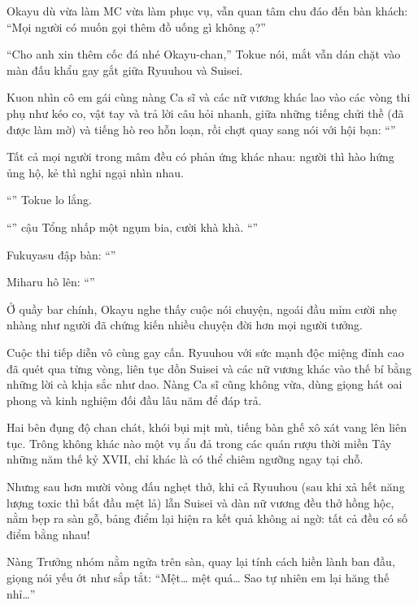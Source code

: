 \documentclass[../main.tex]{subfiles}
\begin{document}
Okayu dù vừa làm MC vừa làm phục vụ, vẫn quan tâm chu đáo đến bàn khách: ``Mọi người có muốn gọi thêm đồ uống gì không ạ?''

``Cho anh xin thêm cốc đá nhé Okayu-chan,'' Tokue nói, mắt vẫn dán chặt vào màn đấu khẩu gay gắt giữa Ryuuhou và Suisei.

Kuon nhìn cô em gái cùng nàng Ca sĩ và các nữ vương khác lao vào các vòng thi phụ như kéo co, vật tay và trả lời câu hỏi nhanh, giữa những tiếng chửi thề (đã được làm mờ) và tiếng hò reo hỗn loạn, rồi chợt quay sang nói với hội bạn: ``''

Tất cả mọi người trong mâm đều có phản ứng khác nhau: người thì hào hứng ủng hộ, kẻ thì nghi ngại nhìn nhau.

``'' Tokue lo lắng.

``'' cậu Tổng nhấp một ngụm bia, cười khà khà. ``''

Fukuyasu đập bàn: ``''

Miharu hô lên: ``''

Ở quầy bar chính, Okayu nghe thấy cuộc nói chuyện, ngoái đầu mỉm cười nhẹ nhàng như người đã chứng kiến nhiều chuyện đời hơn mọi người tưởng.

Cuộc thi tiếp diễn vô cùng gay cấn. Ryuuhou với sức mạnh độc miệng đỉnh cao đã quét qua từng vòng, liên tục dồn Suisei và các nữ vương khác vào thế bí bằng những lời cà khịa sắc như dao. Nàng Ca sĩ cũng không vừa, dùng giọng hát oai phong và kinh nghiệm đối đầu lâu năm để đáp trả.

Hai bên đụng độ chan chát, khói bụi mịt mù, tiếng bàn ghế xô xát vang lên liên tục. Trông không khác nào một vụ ẩu đả trong các quán rượu thời miền Tây những năm thế kỷ XVII, chỉ khác là có thể chiêm ngưỡng ngay tại chỗ.

Nhưng sau hơn mười vòng đấu nghẹt thở, khi cả Ryuuhou (sau khi xả hết năng lượng toxic thì bắt đầu mệt lả) lẫn Suisei và dàn nữ vương đều thở hồng hộc, nằm bẹp ra sàn gỗ, bảng điểm lại hiện ra kết quả không ai ngờ: tất cả đều có số điểm bằng nhau!

Nàng Trưởng nhóm nằm ngửa trên sàn, quay lại tính cách hiền lành ban đầu, giọng nói yếu ớt như sắp tắt: ``Mệt\dots{} mệt quá\dots{} Sao tự nhiên em lại hăng thế nhỉ\dots''
\end{document}
